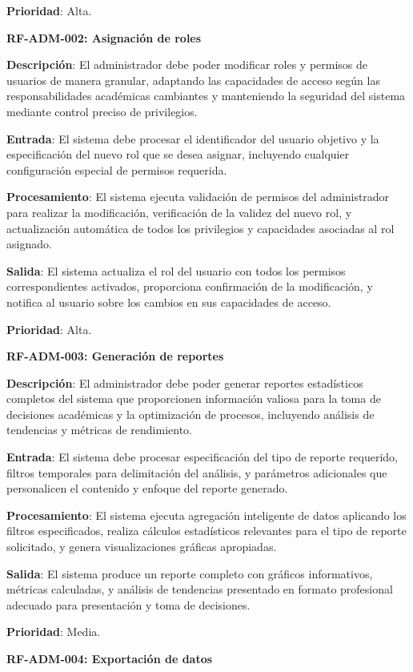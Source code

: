 \documentclass[12pt,a4paper,oneside]{report}
\begin{document}
\textbf{Prioridad}: Alta.

\textbf{RF-ADM-002: Asignación de roles}

\textbf{Descripción}: El administrador debe poder modificar roles y permisos de usuarios de manera granular, adaptando las capacidades de acceso según las responsabilidades académicas cambiantes y manteniendo la seguridad del sistema mediante control preciso de privilegios.

\textbf{Entrada}: El sistema debe procesar el identificador del usuario objetivo y la especificación del nuevo rol que se desea asignar, incluyendo cualquier configuración especial de permisos requerida.

\textbf{Procesamiento}: El sistema ejecuta validación de permisos del administrador para realizar la modificación, verificación de la validez del nuevo rol, y actualización automática de todos los privilegios y capacidades asociadas al rol asignado.

\textbf{Salida}: El sistema actualiza el rol del usuario con todos los permisos correspondientes activados, proporciona confirmación de la modificación, y notifica al usuario sobre los cambios en sus capacidades de acceso.

\textbf{Prioridad}: Alta.

\textbf{RF-ADM-003: Generación de reportes}

\textbf{Descripción}: El administrador debe poder generar reportes estadísticos completos del sistema que proporcionen información valiosa para la toma de decisiones académicas y la optimización de procesos, incluyendo análisis de tendencias y métricas de rendimiento.

\textbf{Entrada}: El sistema debe procesar especificación del tipo de reporte requerido, filtros temporales para delimitación del análisis, y parámetros adicionales que personalicen el contenido y enfoque del reporte generado.

\textbf{Procesamiento}: El sistema ejecuta agregación inteligente de datos aplicando los filtros especificados, realiza cálculos estadísticos relevantes para el tipo de reporte solicitado, y genera visualizaciones gráficas apropiadas.

\textbf{Salida}: El sistema produce un reporte completo con gráficos informativos, métricas calculadas, y análisis de tendencias presentado en formato profesional adecuado para presentación y toma de decisiones.

\textbf{Prioridad}: Media.

\textbf{RF-ADM-004: Exportación de datos}
\end{document}
